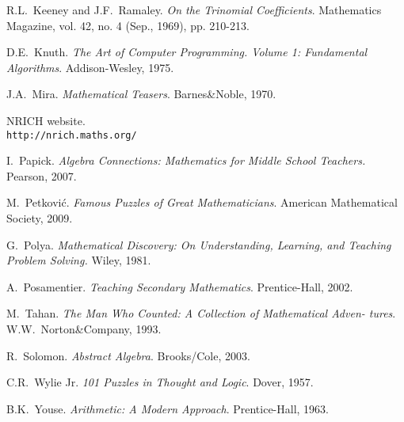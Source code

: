 \begin{fullwidth}
\begin{thebibliography}{99}
 R.L.\ Keeney and J.F.\ Ramaley. \emph{On the Trinomial Coefficients}. Mathematics Magazine, vol. 42, no. 4 (Sep., 1969), pp. 210-213.

 D.E.\ Knuth. \emph{The Art of Computer Programming. Volume 1: Fundamental Algorithms}. Addison-Wesley, 1975.

 J.A.\ Mira. \emph{Mathematical Teasers}. Barnes\&Noble, 1970.

 NRICH website.
\\ \texttt{http://nrich.maths.org/}

 I.\ Papick. \emph{Algebra Connections: Mathematics
  for Middle School Teachers.} Pearson, 2007.

 M.\ Petkovi\'{c}. \emph{Famous Puzzles of Great Mathematicians}. American Mathematical Society, 2009.

 G.\ Polya. \emph{Mathematical Discovery: On
  Understanding, Learning, and Teaching Problem Solving.} Wiley, 1981.

 A.\ Posamentier. \emph{Teaching Secondary Mathematics}. Prentice-Hall, 2002.

 M.\ Tahan. \emph{The Man Who Counted: A Collection of Mathematical Adven-
tures}. W.W.\ Norton\&Company, 1993.

 R.\ Solomon. \emph{Abstract Algebra}. Brooks/Cole, 2003.

 C.R.\ Wylie Jr. \emph{101 Puzzles in Thought and
  Logic}. Dover, 1957.

 B.K.\ Youse. \emph{Arithmetic: A Modern Approach}. Prentice-Hall, 1963.


\end{thebibliography}
\end{fullwidth}


%
\printindex

